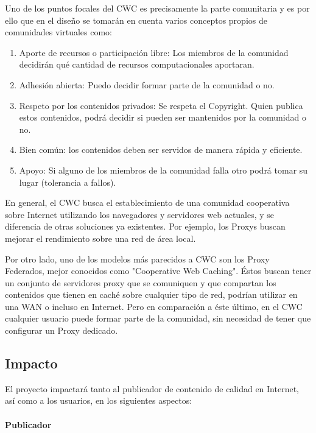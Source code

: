 Uno de los puntos focales del CWC es precisamente la parte comunitaria y es por ello que en el diseño se tomarán en cuenta varios conceptos propios de comunidades virtuales como: 

\begin{enumerate}
\item Aporte de recursos o participación libre: Los miembros de la comunidad decidirán qué cantidad de recursos computacionales aportaran.
\item Adhesión abierta: Puedo decidir formar parte de la comunidad o no.
\item Respeto por los contenidos privados: Se respeta el Copyright. Quien publica estos contenidos, podrá decidir si pueden ser mantenidos por la comunidad o no.
\item Bien común: los contenidos deben ser servidos de manera rápida y eficiente.
\item Apoyo: Si alguno de los miembros de la comunidad falla otro podrá tomar su lugar (tolerancia a fallos).
\end{enumerate}

En general, el CWC busca el establecimiento de una comunidad cooperativa sobre Internet utilizando los navegadores y servidores web actuales, y se diferencia de otras soluciones ya existentes. Por ejemplo, los Proxys buscan mejorar el rendimiento sobre una red de área local. 

Por otro lado, uno de los modelos más parecidos a CWC son los Proxy Federados, mejor conocidos como "Cooperative Web Caching". Éstos buscan tener un conjunto de servidores proxy que se comuniquen y que compartan los contenidos que tienen en caché sobre cualquier tipo de red, podrían utilizar en una WAN o incluso en Internet. Pero en comparación a éste último, en el CWC cualquier usuario puede formar parte de la comunidad, sin necesidad de tener que configurar un Proxy dedicado.


\subsection{Impacto}


El proyecto impactará tanto al publicador de contenido de calidad en Internet, así como a los usuarios, en los siguientes aspectos:

\paragraph{Publicador}


